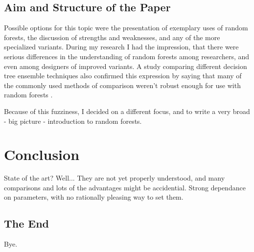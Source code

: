 \documentclass[a4paper,man,12pt,apacite]{apa6} %
\begin{document}
\subsection{Aim and Structure of the Paper}
Possible options for this topic were the presentation of
exemplary uses of random
forests, the discussion of strengths and weaknesses, and any of the more
specialized variants.
During my research I had the impression, that there were serious
differences in the understanding of random forests among researchers,
and even among designers of improved variants.
A study comparing different decision tree ensemble techniques also confirmed
this expression by saying that many of the commonly used methods of comparison
weren't robust enough for use with random forests \cite{banfield2007comparison}.

Because of this fuzziness, I decided on a different focus, and to write
a very broad - big picture - introduction to random forests.

\section{Conclusion}
State of the art? Well... They are not yet properly understood, and
many comparisons and lots of the advantages might be accidential.
Strong dependance on parameters, with no rationally pleasing way to set them.

\subsection{The End}
Bye.


\end{document}

